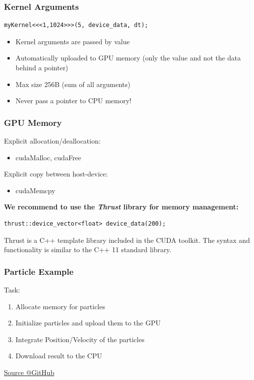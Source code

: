 \documentclass[aspectratio=169]{beamer}
\begin{document}
\begin{frame}[fragile]
\frametitle{Kernel Arguments}

\begin{lstlisting} 
myKernel<<<1,1024>>>(5, device_data, dt);
\end{lstlisting}

\begin{itemize}
	\item Kernel arguments are passed by value
	\item Automatically uploaded to GPU memory (only the value and not the data behind a pointer)
	\item Max size 256B (sum of all arguments)
	\item Never pass a pointer to CPU  memory!
\end{itemize}
\end{frame}


\begin{frame}[fragile]
	\frametitle{GPU Memory}
	Explicit allocation/deallocation:
	\begin{itemize}
		\item cudaMalloc, cudaFree
	\end{itemize}
	Explicit copy between host-device:
	\begin{itemize}
		\item cudaMemcpy
	\end{itemize}
	\textbf{We recommend to use the \textit{Thrust} library for memory management:}
\begin{lstlisting}
thrust::device_vector<float> device_data(200);
\end{lstlisting}

\begin{mdframed}[frametitle=Note:]
	Thrust is a C++ template library included in the CUDA toolkit. The syntax and functionality is similar to the C++ 11 standard library.
\end{mdframed}
	
\end{frame}


\begin{frame}[fragile]
	\frametitle{Particle Example}
	Task:
	\begin{enumerate}
		\item Allocate memory for particles
		\item Initialize particles and upload them to the GPU
		\item Integrate Position/Velocity of the particles
		\item Download result to the CPU
	\end{enumerate}
	
	\href{https://github.com/darglein/CudaTutorial/blob/master/1_Introduction/Code/simple_particle.cu}{Source @GitHub}
\end{frame}
\end{document}
